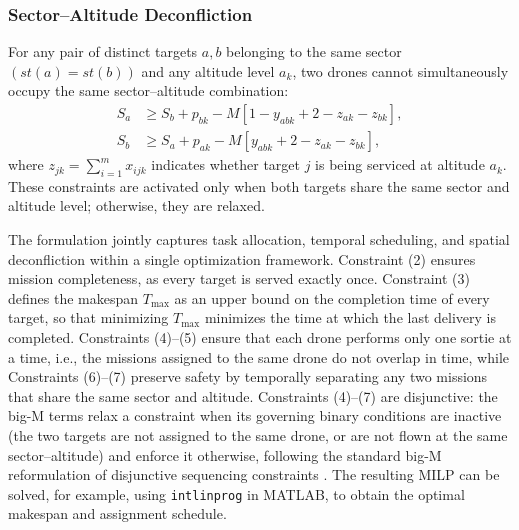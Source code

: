 \documentclass[subscriptcorrection,upint,nolists, varvw,barcolor=Goldenrod3,mathalfa=cal=euler,balance,hyphenate,french]{asmejour} %
\begin{document}
\subsubsection{Sector–Altitude Deconfliction}
For any pair of distinct targets \(a,b\) belonging to the same sector \((st(a)=st(b))\) and any altitude level \(a_k\), two drones cannot simultaneously occupy the same sector–altitude combination:
\begin{align}
    S_a &\ge S_b + p_{bk} - M[1 - y_{abk} + 2 - z_{ak} - z_{bk}], \\
    S_b &\ge S_a + p_{ak} - M[y_{abk} + 2 - z_{ak} - z_{bk}],
\end{align}
where \(z_{jk} = \sum_{i=1}^{m} x_{ijk}\) indicates whether target \(j\) is being serviced at altitude \(a_k\).  
These constraints are activated only when both targets share the same sector and altitude level; otherwise, they are relaxed.





The formulation jointly captures task allocation, temporal scheduling, and spatial deconfliction within a single optimization framework.
Constraint (2) ensures mission completeness, as every target is served exactly once.
Constraint (3) defines the makespan \(T_{\max}\) as an upper bound on the completion time of every target, so that minimizing \(T_{\max}\) minimizes the time at which the last delivery is completed.
Constraints (4)–(5) ensure that each drone performs only one sortie at a time, i.e., the missions assigned to the same drone do not overlap in time, while Constraints (6)–(7) preserve safety by temporally separating any two missions that share the same sector and altitude.
Constraints (4)–(7) are disjunctive: the big-M terms relax a constraint when its governing binary conditions are inactive (the two targets are not assigned to the same drone, or are not flown at the same sector–altitude) and enforce it otherwise, following the standard big-M reformulation of disjunctive sequencing constraints \cite{Manne1960}.
The resulting MILP can be solved, for example, using \texttt{intlinprog} in MATLAB, to obtain the optimal makespan and assignment schedule.
\end{document}
